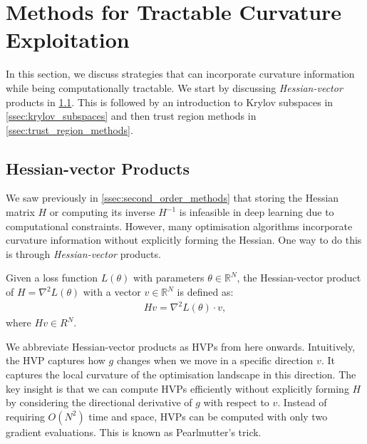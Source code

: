 \section{Methods for Tractable Curvature Exploitation}

\label{sec:tractable_curvature_exploitation}


In this section, we discuss strategies that can incorporate curvature information while being computationally tractable. We start by discussing \textit{Hessian-vector} products in \cref{ssec:hessian_vector_products}. This is followed by an introduction to Krylov subspaces in \cref{ssec:krylov_subspaces} and then trust region methods in \cref{ssec:trust_region_methods}.



\subsection{Hessian-vector Products}

\label{ssec:hessian_vector_products}


We saw previously in \cref{ssec:second_order_methods} that storing the Hessian matrix $H$ or computing its inverse $H^{-1}$ is infeasible in deep learning due to computational constraints. However, many optimisation algorithms incorporate curvature information without explicitly forming the Hessian. One way to do this is through \textit{Hessian-vector} products.

\begin{definition}
    Given a loss function $L(\theta)$ with parameters $\theta \in \mathbb{R}^N$, the Hessian-vector product of $H = \nabla^2 L(\theta)$ with a vector $v \in \mathbb{R}^N$ is defined as:
    \begin{align}
        Hv = \nabla^2 L(\theta) \cdot v, 
    \end{align}
    where $Hv \in R^N$.
\end{definition}
We abbreviate Hessian-vector products as HVPs from here onwards. Intuitively, the HVP captures how $g$ changes when we move in a specific direction $v$. It captures the local curvature of the optimisation landscape in this direction. The key insight is that we can compute HVPs efficiently without explicitly forming $H$ by considering the directional derivative of $g$ with respect to $v$. Instead of requiring $O(N^2)$ time and space, HVPs can be computed with only two gradient evaluations. This is known as Pearlmutter's trick.

